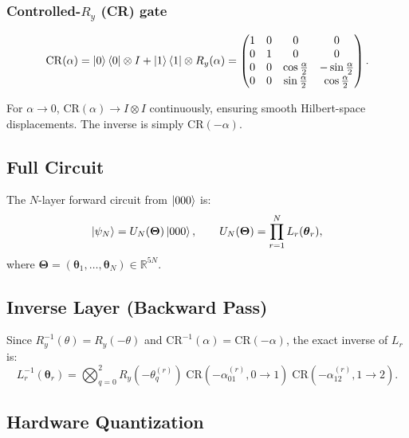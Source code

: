 \documentclass[11pt,a4paper]{article}
\begin{document}
\subsubsection*{Controlled-$R_y$ (CR) gate}
\begin{equation}
    \mathrm{CR}(\alpha) = \ket{0}\bra{0} \otimes I + \ket{1}\bra{1} \otimes R_y(\alpha)
    =
    \begin{pmatrix} 1 & 0 & 0 & 0 \\
    0 & 1 & 0 & 0 \\
    0 & 0 & \cos\frac{\alpha}{2} & -\sin\frac{\alpha}{2} \\
    0 & 0 & \sin\frac{\alpha}{2} & \cos\frac{\alpha}{2}
    \end{pmatrix}.
\end{equation}

For $\alpha \to 0$, $\mathrm{CR}(\alpha) \to I \otimes I$ continuously, ensuring smooth
Hilbert-space displacements. The inverse is simply $\mathrm{CR}(-\alpha)$.

\subsection{Full Circuit}

The $N$-layer forward circuit from $\ket{000}$ is:
\begin{equation}
    \ket{\psi_N} = U_N(\boldsymbol{\Theta})\ket{000},
    \qquad
    U_N(\boldsymbol{\Theta}) = \prod_{r=1}^{N} L_r(\boldsymbol{\theta}_r),
\end{equation}
where $\boldsymbol{\Theta} = (\boldsymbol{\theta}_1, \ldots, \boldsymbol{\theta}_N) \in \mathbb{R}^{5N}$.

\subsection{Inverse Layer (Backward Pass)}

Since $R_y^{-1}(\theta) = R_y(-\theta)$ and $\mathrm{CR}^{-1}(\alpha) = \mathrm{CR}(-\alpha)$,
the exact inverse of $L_r$ is:
\begin{equation}
    L_r^{-1}(\boldsymbol{\theta}_r) =
    \bigotimes_{q=0}^{2} R_y(-\theta_q^{(r)})\;
    \mathrm{CR}(-\alpha_{01}^{(r)}, 0{\to}1)\;
    \mathrm{CR}(-\alpha_{12}^{(r)}, 1{\to}2).
\end{equation}

\subsection{Hardware Quantization}
\end{document}
